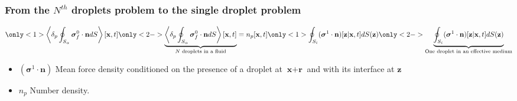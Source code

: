 \documentclass{sintefbeamer}
\begin{document}
\begin{frame}
  \frametitle{From the $N^{th}$ droplets problem to the single droplet problem}
  
    \begin{equation*}
      \only<1>{\pSavg{{\bm{\sigma}_f^0 \cdot \textbf{n}}}[\textbf{x},t]}
      \only<2->{\underbrace{\pSavg{{\bm{\sigma}_f^0 \cdot \textbf{n}}}[\textbf{x},t]}_\text{$N$ droplets in a fluid}}
      =
      n_p[\textbf{x},t]
      \only<1>{\intS[i]{(\bm\sigma^1 \cdot \textbf{n})[\textbf{z}|\textbf{x},t]}(\textbf{z})}
      \only<2->{\underbrace{\intS[i]{(\bm\sigma^1 \cdot \textbf{n})[\textbf{z}|\textbf{x},t]}(\textbf{z})}_\text{One droplet in an effective medium}}
    \end{equation*}
  \begin{itemize}
    \item $(\bm\sigma^1 \cdot \textbf{n})$ Mean force density conditioned on the presence of a droplet at $\textbf{x}+\textbf{r}$ and with its interface at $\textbf{z}$
    \item $n_p$ Number density. 
  \end{itemize}
\vfill
{}
\end{frame}
\end{document}
